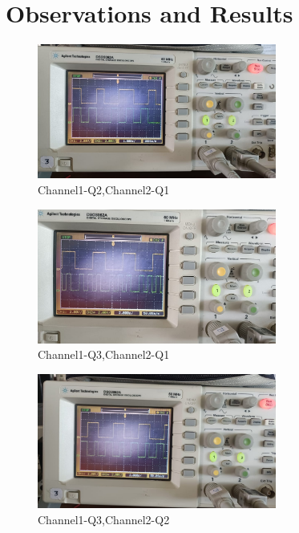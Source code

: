 \documentclass[12pt,a4paper]{article}
\begin{document}
\section{Observations and Results}
\begin{figure}[H]
    \centering
    \includegraphics[width=0.7\textwidth]{figs/Q0Q1.jpeg} 
    \caption{Channel1-Q2,Channel2-Q1}
\end{figure}
\begin{figure}[H]
    \centering
    \includegraphics[width=0.7\textwidth]{figs/Q0Q2.jpeg} 
    \caption{Channel1-Q3,Channel2-Q1}
\end{figure}
\begin{figure}[H]
    \centering
    \includegraphics[width=0.7\textwidth]{figs/Q1Q2.jpeg} 
    \caption{Channel1-Q3,Channel2-Q2}
\end{figure}
\end{document}
